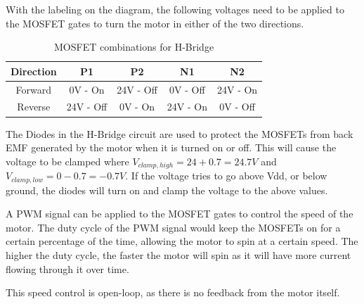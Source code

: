 \documentclass{article}
\begin{document}
With the labeling on the diagram, the following voltages need to be applied to the MOSFET gates to turn the motor in either of the two directions.
\begin{table}[ht!]
    \centering
    \begin{tabular}{|c|c|c|c|c|}
        \hline
        \textbf{Direction} & \textbf{P1} & \textbf{P2} & \textbf{N1} & \textbf{N2} \\ \hline
        Forward & 0V - On & 24V - Off & 0V - Off & 24V - On \\ 
        \hline
        Reverse & 24V - Off & 0V - On & 24V - On & 0V - Off \\ 
        \hline
    \end{tabular}
    \caption{MOSFET combinations for H-Bridge}
    \label{tab:mosfet_combinations}
\end{table}

The Diodes in the H-Bridge circuit are used to protect the MOSFETs from back EMF generated by the motor when it is turned on or off. This will cause the voltage to be clamped where $V_{clamp, high} = 24 + 0.7 = 24.7V$ and $V_{clamp, low} = 0 - 0.7 = -0.7 V$. If the voltage tries to go above Vdd, or below ground, the diodes will turn on and clamp the voltage to the above values.

A PWM signal can be applied to the MOSFET gates to control the speed of the motor. The duty cycle of the PWM signal would keep the MOSFETs on for a certain percentage of the time, allowing the motor to spin at a certain speed. The higher the duty cycle, the faster the motor will spin as it will have more current flowing through it over time. 

This speed control is open-loop, as there is no feedback from the motor itself.






\end{document}
